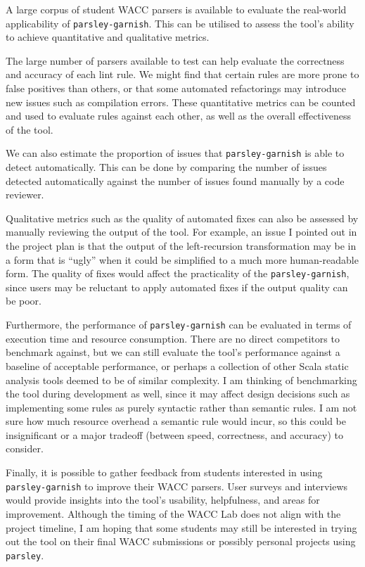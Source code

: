 \documentclass[../../main.tex]{subfiles}
\begin{document}

A large corpus of student WACC parsers is available to evaluate the real-world applicability of \texttt{parsley-garnish}.
This can be utilised to assess the tool's ability to achieve quantitative and qualitative metrics.

The large number of parsers available to test can help evaluate the correctness and accuracy of each lint rule.
We might find that certain rules are more prone to false positives than others, or that some automated refactorings may introduce new issues such as compilation errors.
These quantitative metrics can be counted and used to evaluate rules against each other, as well as the overall effectiveness of the tool.

We can also estimate the proportion of issues that \texttt{parsley-garnish} is able to detect automatically.
This can be done by comparing the number of issues detected automatically against the number of issues found manually by a code reviewer.

Qualitative metrics such as the quality of automated fixes can also be assessed by manually reviewing the output of the tool.
For example, an issue I pointed out in the project plan is that the output of the left-recursion transformation may be in a form that is ``ugly'' when it could be simplified to a much more human-readable form.
The quality of fixes would affect the practicality of the \texttt{parsley-garnish}, since users may be reluctant to apply automated fixes if the output quality can be poor.

Furthermore, the performance of \texttt{parsley-garnish} can be evaluated in terms of execution time and resource consumption.
There are no direct competitors to benchmark against, but we can still evaluate the tool's performance against a baseline of acceptable performance, or perhaps a collection of other Scala static analysis tools deemed to be of similar complexity.
I am thinking of benchmarking the tool during development as well, since it may affect design decisions such as implementing some rules as purely syntactic rather than semantic rules.
I am not sure how much resource overhead a semantic rule would incur, so this could be insignificant or a major tradeoff (between speed, correctness, and accuracy) to consider.

Finally, it is possible to gather feedback from students interested in using \texttt{parsley-garnish} to improve their WACC parsers.
User surveys and interviews would provide insights into the tool's usability, helpfulness, and areas for improvement.
Although the timing of the WACC Lab does not align with the project timeline, I am hoping that some students may still be interested in trying out the tool on their final WACC submissions or possibly personal projects using \texttt{parsley}.
\end{document}
